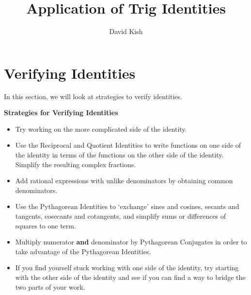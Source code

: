 \documentclass{ximera}
\author{David Kish}
\title{Application of Trig Identities}
\begin{document}
\begin{abstract}
  
\end{abstract}
\maketitle





\section{Verifying Identities}
In this section, we will look at strategies to verify identities.
\begin{remark}
\centerline{\textbf{Strategies for Verifying Identities}} 

\begin{itemize}

\item  Try working on the more complicated side of the identity.

\item Use the Reciprocal and Quotient Identities to write functions on one side of the identity in terms of the functions on the other side of the identity.  Simplify the resulting complex fractions.

\item Add rational expressions with unlike denominators by obtaining common denominators.

\item  Use the Pythagorean Identities to `exchange' sines and cosines, secants and tangents, cosecants and cotangents, and simplify sums or differences of squares to one term. 

\item Multiply numerator \textbf{and} denominator by Pythagorean
Conjugates in order to take advantage of the Pythagorean Identities.

\item If you find yourself stuck working with one side of the identity, try starting with the other side of the identity and see if you can find a way to bridge the two parts of your work.


\end{itemize}
\end{remark}
\end{document}
